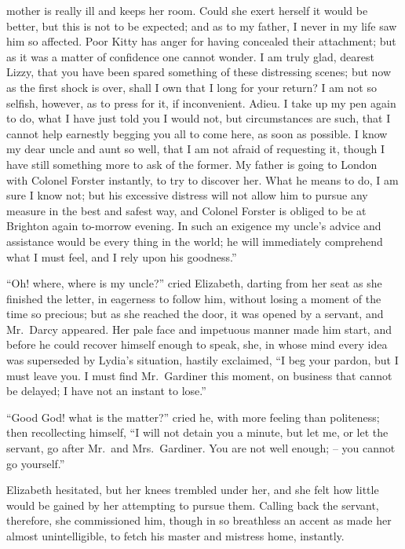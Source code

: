 mother is really ill and keeps her room. Could she exert
herself it would be better, but this is not to be expected;
and as to my father, I never in my life saw him so affected.
Poor Kitty has anger for having concealed their attachment;
but as it was a matter of confidence one cannot
wonder. I am truly glad, dearest Lizzy, that you have
been spared something of these distressing scenes; but
now as the first shock is over, shall I own that I long for
your return? I am not so selfish, however, as to press
for it, if inconvenient. Adieu. I take up my pen again
to do, what I have just told you I would not, but circumstances
are such, that I cannot help earnestly begging
you all to come here, as soon as possible. I know my dear
uncle and aunt so well, that I am not afraid of requesting
it, though I have still something more to ask of the former.
My father is going to London with Colonel Forster instantly,
to try to discover her. What he means to do,
I am sure I know not; but his excessive distress will not
allow him to pursue any measure in the best and safest
way, and Colonel Forster is obliged to be at Brighton
again to-morrow evening. In such an exigence my uncle’s
advice and assistance would be every thing in the world;
he will immediately comprehend what I must feel, and
I rely upon his goodness.”

“Oh! where, where is my uncle?” cried Elizabeth,
darting from her seat as she finished the letter, in eagerness
to follow him, without losing a moment of the time so
precious; but as she reached the door, it was opened by
a servant, and Mr.\ Darcy appeared. Her pale face and
impetuous manner made him start, and before he could
recover himself enough to speak, she, in whose mind every
idea was superseded by Lydia’s situation, hastily exclaimed,
“I beg your pardon, but I must leave you. I must find
Mr.\ Gardiner this moment, on business that cannot be
delayed; I have not an instant to lose.”

“Good God! what is the matter?” cried he, with
more feeling than politeness; then recollecting himself,
“I will not detain you a minute, but let me, or let the
servant, go after Mr.\ and Mrs.\ Gardiner. You are not well
enough; -- you cannot go yourself.”

Elizabeth hesitated, but her knees trembled under her,
and she felt how little would be gained by her attempting
to pursue them. Calling back the servant, therefore, she
commissioned him, though in so breathless an accent as
made her almost unintelligible, to fetch his master and
mistress home, instantly.


